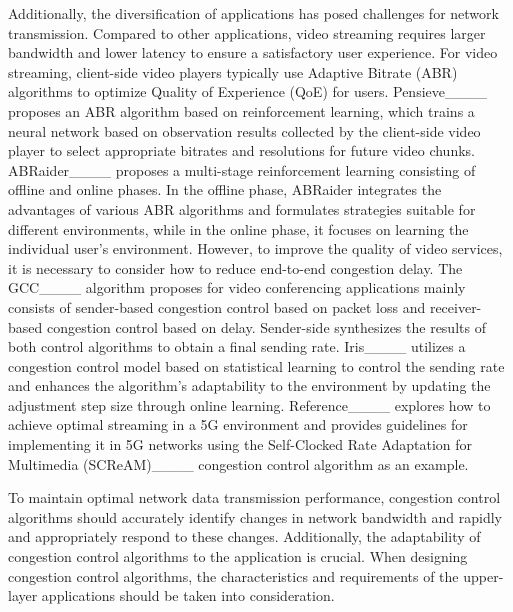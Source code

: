 Additionally, the diversification of applications has posed challenges for network transmission. Compared to other applications, video streaming requires larger bandwidth and lower latency to ensure a satisfactory user experience. For video streaming, client-side video players typically use Adaptive Bitrate (ABR) algorithms to optimize Quality of Experience (QoE) for users. Pensieve____ proposes an ABR algorithm based on reinforcement learning, which trains a neural network based on observation results collected by the client-side video player to select appropriate bitrates and resolutions for future video chunks. ABRaider____ proposes a multi-stage reinforcement learning consisting of offline and online phases. In the offline phase, ABRaider integrates the advantages of various ABR algorithms and formulates strategies suitable for different environments, while in the online phase, it focuses on learning the individual user's environment. However, to improve the quality of video services, it is necessary to consider how to reduce end-to-end congestion delay. The GCC____ algorithm proposes for video conferencing applications mainly consists of sender-based congestion control based on packet loss and receiver-based congestion control based on delay. Sender-side synthesizes the results of both control algorithms to obtain a final sending rate. Iris____ utilizes a congestion control model based on statistical learning to control the sending rate and enhances the algorithm's adaptability to the environment by updating the adjustment step size through online learning. Reference____ explores how to achieve optimal streaming in a 5G environment and provides guidelines for implementing it in 5G networks using the Self-Clocked Rate Adaptation for Multimedia (SCReAM)____ congestion control algorithm as an example.

To maintain optimal network data transmission performance, congestion control algorithms should accurately identify changes in network bandwidth and rapidly and appropriately respond to these changes. Additionally, the adaptability of congestion control algorithms to the application is crucial. When designing congestion control algorithms, the characteristics and requirements of the upper-layer applications should be taken into consideration.